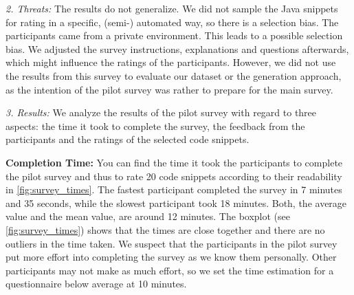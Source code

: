 \documentclass[%
class=scrreprt,
chapterprefix=false,%
open=right,%
twoside=false,%
paper=a4,%
logofile={Logo\_zentral\_farbig\_EN.png},%
thesistype=master,%
UKenglish,%
]{se2thesis}
\theoremstyle{definition}
\begin{document}
	\textit{2. Threats:}
	The results do not generalize. We did not sample the Java snippets for rating in a specific, (semi-) automated way, so there is a selection bias. The participants came from a private environment. This leads to a possible selection bias.
	We adjusted the survey instructions, explanations and questions afterwards, which might influence the ratings of the participants.
	However, we did not use the results from this survey to evaluate our dataset or the generation approach, as the intention of the pilot survey was rather to prepare for the main survey. 
	
	\textit{3. Results:}
	We analyze the results of the pilot survey with regard to three aspects: the time it took to complete the survey, the feedback from the participants and the ratings of the selected code snippets.
	
	\textbf{Completion Time:} 
	You can find the time it took the participants to complete the pilot survey and thus to rate 20 code snippets according to their readability in \autoref{fig:survey_times}.
	The fastest participant completed the survey in 7 minutes and 35 seconds, while the slowest participant took 18 minutes. 
	Both, the average value and the mean value, are around 12 minutes. The boxplot (see \autoref{fig:survey_times}) shows that the times are close together and there are no outliers in the time taken.
	We suspect that the participants in the pilot survey put more effort into completing the survey as we know them personally. 
	Other participants may not make as much effort, so we set the time estimation for a questionnaire below average at 10 minutes.
		
\end{document}
